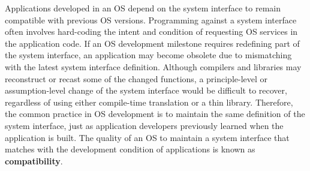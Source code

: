 



Applications developed in an OS depend on the system interface
to remain compatible with previous OS versions.
Programming against a system interface often involves
hard-coding the intent and condition of requesting OS services
in the application code.
If an OS development milestone requires redefining part of the system interface,
an application may become obsolete
due to mismatching with the latest system interface definition.
Although compilers and libraries may reconstruct or recast some of the changed functions,
a principle-level or assumption-level change of the system interface
would be difficult to recover,
regardless of using either compile-time translation or a thin library.
Therefore, the common practice in OS development is to maintain
the same definition of the system interface,
just as application developers previously learned when the application is built.
The quality of an OS to maintain a system interface
that matches with the development condition of applications
is known as {\bf compatibility}.




